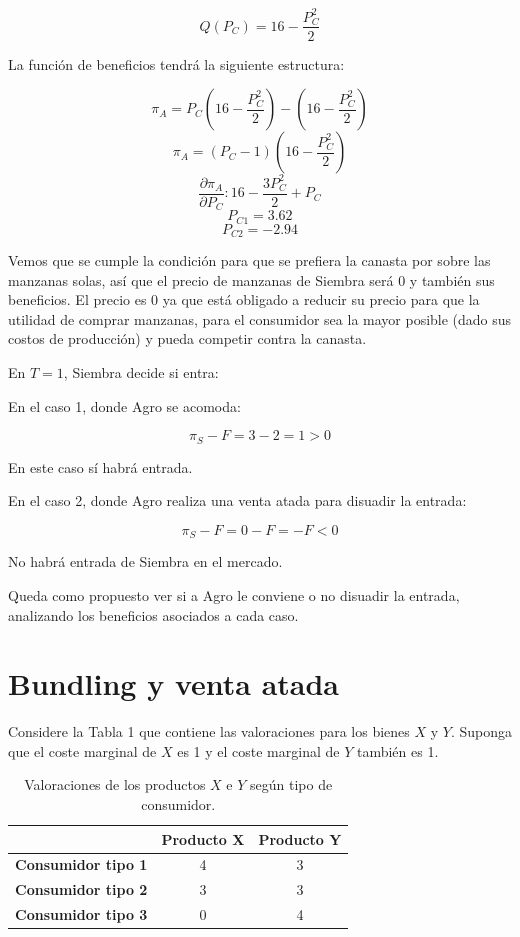 \documentclass{exam}
\begin{document}
\begin{enumerate}
\begin{solution}
        \[
        Q(P_C) = 16 - \frac{P_C^2}{2}
        \]

        La función de beneficios tendrá la siguiente estructura:

        \[
        \pi_A = P_C \left( 16 - \frac{P_C^2}{2} \right) - \left( 16 - \frac{P_C^2}{2} \right)
        \]
        \[
        \pi_A = (P_C - 1) \left( 16 - \frac{P_C^2}{2} \right)
        \]
        \[
        \frac{\partial \pi_A}{\partial P_C} : 16 - \frac{3P_C^2}{2} + P_C
        \]
        \[
        P_{C1} = 3.62
        \]
        \[
        P_{C2} = -2.94
        \]

        Vemos que se cumple la condición para que se prefiera la canasta por sobre las manzanas solas, así que el precio de manzanas de Siembra será 0 y también sus beneficios. El precio es 0 ya que está obligado a reducir su precio para que la utilidad de comprar manzanas, para el consumidor sea la mayor posible (dado sus costos de producción) y pueda competir contra la canasta.

        En $T = 1$, Siembra decide si entra:

        En el caso 1, donde Agro se acomoda:

        \[
        \pi_S - F = 3 - 2 = 1 > 0
        \]

        En este caso sí habrá entrada.

        En el caso 2, donde Agro realiza una venta atada para disuadir la entrada:

        \[
        \pi_S - F = 0 - F = -F < 0
        \]

        No habrá entrada de Siembra en el mercado.

        Queda como propuesto ver si a Agro le conviene o no disuadir la entrada, analizando los beneficios asociados a cada caso.
    \end{solution}
\end{enumerate}

\newpage
\section*{Bundling y venta atada}

Considere la Tabla 1 que contiene las valoraciones para los bienes $X$ y $Y$. Suponga que el coste marginal de $X$ es 1 y el coste marginal de $Y$ también es 1.

\begin{table}[h!]
\centering
\begin{tabular}{|c|c|c|}
\hline
 & \textbf{Producto X} & \textbf{Producto Y} \\
\hline
\textbf{Consumidor tipo 1} & 4 & 3 \\
\hline
\textbf{Consumidor tipo 2} & 3 & 3 \\
\hline
\textbf{Consumidor tipo 3} & 0 & 4 \\
\hline
\end{tabular}
\caption{Valoraciones de los productos $X$ e $Y$ según tipo de consumidor.}
\end{table}
\end{document}

